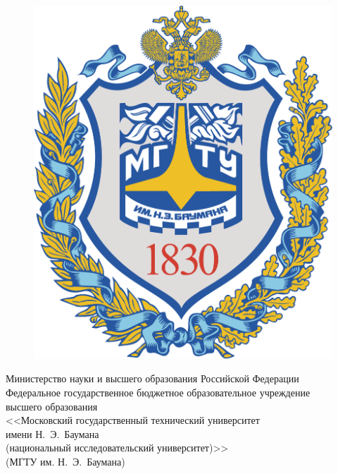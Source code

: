 \begin{titlepage}
	\centering
	
	\begin{figure}
		\vspace{3.4mm}
		\hspace{-8mm}
		\includegraphics[width=0.89\linewidth]{assets/bmstu-logo}
	\end{figure}
	
	{
		\singlespacing \small {}\selectfont
		Министерство науки и высшего образования Российской Федерации \\
		Федеральное государственное бюджетное образовательное учреждение \\
		высшего образования \\
		<<Московский государственный технический университет \\
		имени Н.~Э.~Баумана \\
		(национальный исследовательский университет)>> \\
		(МГТУ им. Н.~Э.~Баумана) \\
	}
	
	\vspace{-4.2mm}
	\vhrulefill{0.2mm} \\
	\vspace{-6mm}
	\vhrulefill{0.9mm} \\
	\vspace{2.8mm}
	

\end{titlepage}
